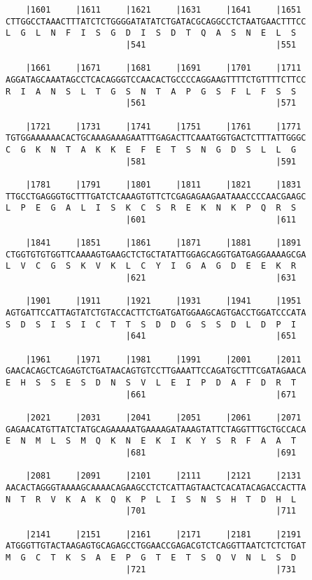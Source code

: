 \documentclass{article}
\begin{document}
\begin{Verbatim}
    |1601     |1611     |1621     |1631     |1641     |1651 
CTTGGCCTAAACTTTATCTCTGGGGATATATCTGATACGCAGGCCTCTAATGAACTTTCC
L  G  L  N  F  I  S  G  D  I  S  D  T  Q  A  S  N  E  L  S  
                        |541                          |551  
  
    |1661     |1671     |1681     |1691     |1701     |1711 
AGGATAGCAAATAGCCTCACAGGGTCCAACACTGCCCCAGGAAGTTTTCTGTTTTCTTCC
R  I  A  N  S  L  T  G  S  N  T  A  P  G  S  F  L  F  S  S  
                        |561                          |571  
  
    |1721     |1731     |1741     |1751     |1761     |1771 
TGTGGAAAAAACACTGCAAAGAAAGAATTTGAGACTTCAAATGGTGACTCTTTATTGGGC
C  G  K  N  T  A  K  K  E  F  E  T  S  N  G  D  S  L  L  G  
                        |581                          |591  
  
    |1781     |1791     |1801     |1811     |1821     |1831 
TTGCCTGAGGGTGCTTTGATCTCAAAGTGTTCTCGAGAGAAGAATAAACCCCAACGAAGC
L  P  E  G  A  L  I  S  K  C  S  R  E  K  N  K  P  Q  R  S  
                        |601                          |611  
  
    |1841     |1851     |1861     |1871     |1881     |1891 
CTGGTGTGTGGTTCAAAAGTGAAGCTCTGCTATATTGGAGCAGGTGATGAGGAAAAGCGA
L  V  C  G  S  K  V  K  L  C  Y  I  G  A  G  D  E  E  K  R  
                        |621                          |631  
  
    |1901     |1911     |1921     |1931     |1941     |1951 
AGTGATTCCATTAGTATCTGTACCACTTCTGATGATGGAAGCAGTGACCTGGATCCCATA
S  D  S  I  S  I  C  T  T  S  D  D  G  S  S  D  L  D  P  I  
                        |641                          |651  
  
    |1961     |1971     |1981     |1991     |2001     |2011 
GAACACAGCTCAGAGTCTGATAACAGTGTCCTTGAAATTCCAGATGCTTTCGATAGAACA
E  H  S  S  E  S  D  N  S  V  L  E  I  P  D  A  F  D  R  T  
                        |661                          |671  
  
    |2021     |2031     |2041     |2051     |2061     |2071 
GAGAACATGTTATCTATGCAGAAAAATGAAAAGATAAAGTATTCTAGGTTTGCTGCCACA
E  N  M  L  S  M  Q  K  N  E  K  I  K  Y  S  R  F  A  A  T  
                        |681                          |691  
  
    |2081     |2091     |2101     |2111     |2121     |2131 
AACACTAGGGTAAAAGCAAAACAGAAGCCTCTCATTAGTAACTCACATACAGACCACTTA
N  T  R  V  K  A  K  Q  K  P  L  I  S  N  S  H  T  D  H  L  
                        |701                          |711  
  
    |2141     |2151     |2161     |2171     |2181     |2191 
ATGGGTTGTACTAAGAGTGCAGAGCCTGGAACCGAGACGTCTCAGGTTAATCTCTCTGAT
M  G  C  T  K  S  A  E  P  G  T  E  T  S  Q  V  N  L  S  D  
                        |721                          |731  
  

\end{Verbatim}
\end{document}
